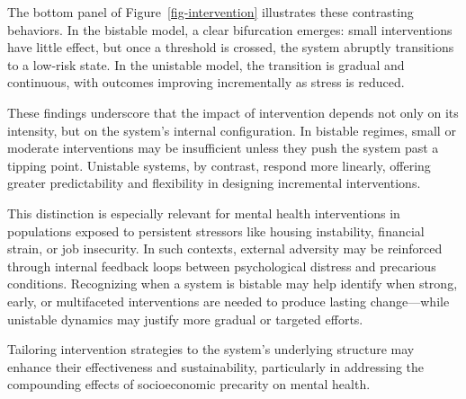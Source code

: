 \documentclass[
]{article}
\begin{document}
The bottom panel of Figure~\ref{fig-intervention} illustrates these
contrasting behaviors. In the bistable model, a clear bifurcation
emerges: small interventions have little effect, but once a threshold is
crossed, the system abruptly transitions to a low-risk state. In the
unistable model, the transition is gradual and continuous, with outcomes
improving incrementally as stress is reduced.

These findings underscore that the impact of intervention depends not
only on its intensity, but on the system's internal configuration. In
bistable regimes, small or moderate interventions may be insufficient
unless they push the system past a tipping point. Unistable systems, by
contrast, respond more linearly, offering greater predictability and
flexibility in designing incremental interventions.

This distinction is especially relevant for mental health interventions
in populations exposed to persistent stressors like housing instability,
financial strain, or job insecurity. In such contexts, external
adversity may be reinforced through internal feedback loops between
psychological distress and precarious conditions. Recognizing when a
system is bistable may help identify when strong, early, or multifaceted
interventions are needed to produce lasting change---while unistable
dynamics may justify more gradual or targeted efforts.

Tailoring intervention strategies to the system's underlying structure
may enhance their effectiveness and sustainability, particularly in
addressing the compounding effects of socioeconomic precarity on mental
health.
\end{document}
